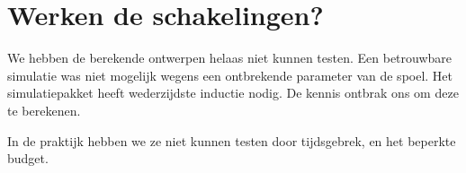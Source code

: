 \documentclass[11pt,a4paper]{article}
\begin{document}
\section{Werken de schakelingen?}

We hebben de berekende ontwerpen helaas niet kunnen testen. Een betrouwbare simulatie was niet mogelijk wegens een ontbrekende parameter van de spoel. Het simulatiepakket heeft wederzijdste inductie nodig. De kennis ontbrak ons om deze te berekenen.

In de praktijk hebben we ze niet kunnen testen door tijdsgebrek, en  het beperkte budget. 
\end{document}
